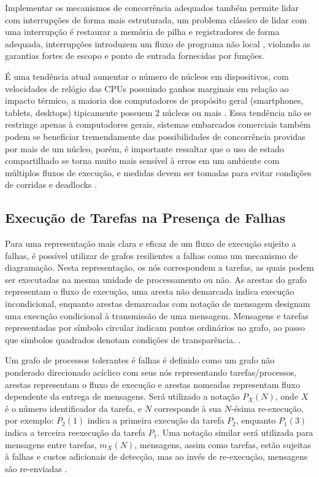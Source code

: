Implementar os mecanismos de concorrência adequados também permite lidar com interrupções de forma mais estruturada, um problema clássico de lidar com uma interrupção é restaurar a memória de pilha e registradores de forma adequada, interrupções introduzem um fluxo de programa não local
, violando as garantias fortes de escopo e ponto de entrada fornecidas por funções.

É uma tendência atual aumentar o número de núcleos em dispositivos, com velocidades de relógio das CPUs possuindo ganhos marginais em relação ao impacto térmico, a maioria dos computadores de propósito geral (smartphones, tablets, desktops) tipicamente possuem 2 núcleos ou mais \cite{ComputerOrganizationAndDesign}. Essa tendência não se restringe apenas à computadores gerais, sistemas embarcados comerciais também podem se beneficiar tremendamente das possibilidades de concorrência providas por mais de um núcleo, porém, é importante ressaltar que o uso de estado compartilhado se torna muito mais sensível à erros em um ambiente com múltiplos fluxos de execução, e medidas devem ser tomadas para evitar condições de corridas e deadlocks \cite{OperatingSystemConcepts}.

\subsection{Execução de Tarefas na Presença de Falhas}

Para uma representação mais clara e eficaz de um fluxo de execução sujeito a falhas, é possível utilizar de grafos resilientes a falhas como um mecanismo de diagramação. Nesta representação, os nós correspondem a tarefas, as quais podem ser executadas na mesma unidade de processamento ou não. As arestas do grafo representam o fluxo de execução, uma aresta não demarcada indica execução incondicional, enquanto arestas demarcadas com notação de mensagem designam uma execução condicional à transmissão de uma mensagem. Mensagens e tarefas representadas por símbolo circular indicam pontos ordinários no grafo, ao passo que símbolos quadrados denotam condições de transparência. \cite{SchedAndOptOfDistributedFT}.

Um grafo de processos tolerantes é falhas é definido como um grafo não ponderado direcionado acíclico com seus nós representando tarefas/processos, arestas representam o fluxo de execução e arestas nomeadas representam fluxo dependente da entrega de mensagens. Será utilizado a notação $P_X (N)$, onde $X$ é o número identificador da tarefa, e $N$ corresponde à sua $N$-ésima re-execução, por exemplo: $P_2 (1)$ indica a primeira execução da tarefa $P_2$, enquanto $P_1 (3)$ indica a terceira reexecução da tarefa $P_1$. Uma notação similar será utilizada para mensagens entre tarefas, $m_X (N)$, mensagens, assim como tarefas, estão sujeitas à falhas e custos adicionais de detecção, mas ao invés de re-execução, mensagens são re-enviadas \cite{SchedFTWithSoftAndHardConstraints}.

